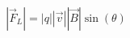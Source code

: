 \documentclass[preview]{standalone}
\begin{document}
\begin{align*}
|\vec{F}_L| = |q| |\vec{v}| |\vec{B}| \sin(\theta)
\end{align*}
\end{document}
